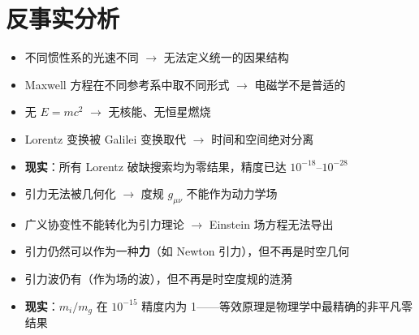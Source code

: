 \section*{反事实分析}

\begin{limitbox}
  \begin{itemize}
    \item 不同惯性系的光速不同 $\to$ 无法定义统一的因果结构
    \item Maxwell 方程在不同参考系中取不同形式 $\to$ 电磁学不是普适的
    \item 无 $E=mc^2$ $\to$ 无核能、无恒星燃烧
    \item Lorentz 变换被 Galilei 变换取代 $\to$ 时间和空间绝对分离
    \item \textbf{现实}：所有 Lorentz 破缺搜索均为零结果，精度已达 $10^{-18}$--$10^{-28}$
  \end{itemize}
\end{limitbox}

\begin{limitbox}
  \begin{itemize}
    \item 引力无法被几何化 $\to$ 度规 $g_{\mu\nu}$ 不能作为动力学场
    \item 广义协变性不能转化为引力理论 $\to$ Einstein 场方程无法导出
    \item 引力仍然可以作为一种\textbf{力}（如 Newton 引力），但不再是时空几何
    \item 引力波仍有（作为场的波），但不再是时空度规的涟漪
    \item \textbf{现实}：$m_i/m_g$ 在 $10^{-15}$ 精度内为 1——等效原理是物理学中最精确的非平凡零结果
  \end{itemize}
\end{limitbox}
